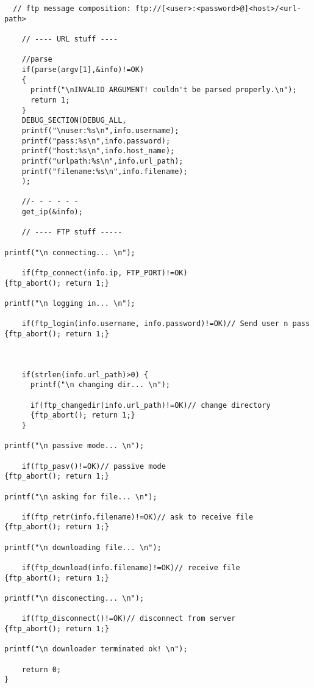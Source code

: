 \begin{lstlisting}
  // ftp message composition: ftp://[<user>:<password>@]<host>/<url-path>
  
	// ---- URL stuff ----

	//parse
	if(parse(argv[1],&info)!=OK)
	{
	  printf("\nINVALID ARGUMENT! couldn't be parsed properly.\n");
	  return 1;
	}
	DEBUG_SECTION(DEBUG_ALL,
	printf("\nuser:%s\n",info.username);
	printf("pass:%s\n",info.password);
	printf("host:%s\n",info.host_name);
	printf("urlpath:%s\n",info.url_path);
	printf("filename:%s\n",info.filename);
	);
  
	//- - - - - -
	get_ip(&info);
	
	// ---- FTP stuff -----
		
printf("\n connecting... \n");
	
	if(ftp_connect(info.ip, FTP_PORT)!=OK)
{ftp_abort(); return 1;}

printf("\n logging in... \n");

	if(ftp_login(info.username, info.password)!=OK)// Send user n pass
{ftp_abort(); return 1;}
		

		
	if(strlen(info.url_path)>0) {
	  printf("\n changing dir... \n");
	  
	  if(ftp_changedir(info.url_path)!=OK)// change directory
	  {ftp_abort(); return 1;}
	}
	
printf("\n passive mode... \n");

	if(ftp_pasv()!=OK)// passive mode
{ftp_abort(); return 1;}

printf("\n asking for file... \n");

	if(ftp_retr(info.filename)!=OK)// ask to receive file
{ftp_abort(); return 1;}

printf("\n downloading file... \n");

	if(ftp_download(info.filename)!=OK)// receive file
{ftp_abort(); return 1;}

printf("\n disconecting... \n");

	if(ftp_disconnect()!=OK)// disconnect from server
{ftp_abort(); return 1;}

printf("\n downloader terminated ok! \n");

	return 0;
}

\end{lstlisting}